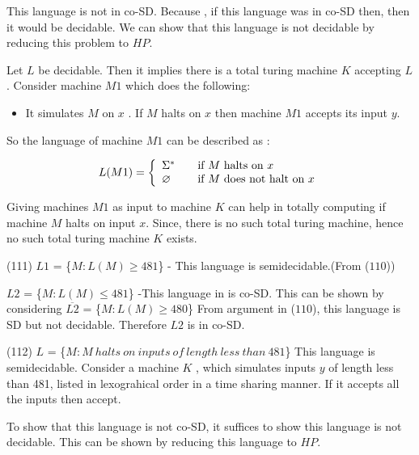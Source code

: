 \documentclass[addpoints,12pt]{exam}
\begin{document}
\begin{questions}
	This language is not in co-SD. Because , if this language was in co-SD then, then it would be decidable. We can show that this language is not decidable by reducing this problem to $HP$.
	\newline
	 
	 Let $L$ be decidable. Then it implies there is a total turing machine $K$ accepting $L$. \newline
	 Consider machine $M1$ which does the following:
	\begin{itemize}
	\item 
	It simulates $M$ on $x$ . If $M$ halts on $x$ then machine $M1$ accepts its input $y$.
  
	\end{itemize}
	So the language of machine $M1$ can be described as : 
  
	\[
	  L(M1) = \left\{ 
	\begin{array}{l l}
	  \Sigma^\ast & \quad \text{if $M$ halts on $x$}\\
	  \varnothing & \quad \text{if $M$ does not halt on $x$}\\
	\end{array} \right.
      \]

      Giving machines $M1$ as input to machine $K$ can help in totally computing if machine $M$ halts on input $x$. Since, there is no such total turing machine, hence no such total turing machine $K$ exists.
	 
      (111) \quad $L1$ = \{$M:L(M)\geqslant481$\} - This language is semidecidable.(From ($110$)) \newline
      
      $L2$ = \{$M:L(M)\leqslant481$\} -This language in is co-SD. This can be shown by considering $\overline{L2}$ = \{$M:L(M)\geqslant480$\} \newline
      From argument in ($110$), this language is SD but not decidable. Therefore $L2$ is in co-SD.
      \newline
      
      (112) \quad $L$ = \{$M:M~halts~on~inputs~of~length~less~than~481$\} \newline
      This language is semidecidable. Consider a machine $K$ , which simulates inputs $y$ of length less than 481, listed in lexograhical order in a time sharing manner. If it accepts
      all the inputs then accept. \newline
      
      To show that this language is not co-SD, it suffices to show this language is not decidable. This can be shown by reducing this language to $HP$.
      \newline
      

\end{questions}
\end{document}
